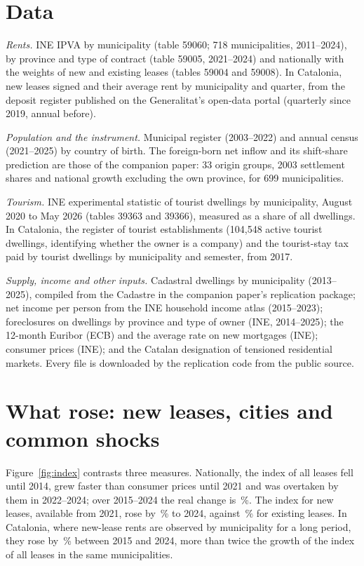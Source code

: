 \documentclass[11pt,a4paper]{article}
\begin{document}




\section{Data}\label{sec:data}

\textit{Rents.} INE IPVA by municipality (table 59060; 718 municipalities, 2011--2024), by province and type of contract (table 59005, 2021--2024) and nationally with the weights of new and existing leases (tables 59004 and 59008). In Catalonia, new leases signed and their average rent by municipality and quarter, from the deposit register published on the Generalitat's open-data portal (quarterly since 2019, annual before).

\textit{Population and the instrument.} Municipal register (2003--2022) and annual census (2021--2025) by country of birth. The foreign-born net inflow and its shift-share prediction are those of the companion paper: 33 origin groups, 2003 settlement shares and national growth excluding the own province, for 699 municipalities.

\textit{Tourism.} INE experimental statistic of tourist dwellings by municipality, August 2020 to May 2026 (tables 39363 and 39366), measured as a share of all dwellings. In Catalonia, the register of tourist establishments (104,548 active tourist dwellings, identifying whether the owner is a company) and the tourist-stay tax paid by tourist dwellings by municipality and semester, from 2017.

\textit{Supply, income and other inputs.} Cadastral dwellings by municipality (2013--2025), compiled from the Cadastre in the companion paper's replication package; net income per person from the INE household income atlas (2015--2023); foreclosures on dwellings by province and type of owner (INE, 2014--2025); the 12-month Euribor (ECB) and the average rate on new mortgages (INE); consumer prices (INE); and the Catalan designation of tensioned residential markets. Every file is downloaded by the replication code from the public source.

\section{What rose: new leases, cities and common shocks}\label{sec:facts}

Figure~\ref{fig:index} contrasts three measures. Nationally, the index of all leases fell until 2014, grew faster than consumer prices until 2021 and was overtaken by them in 2022--2024; over 2015--2024 the real change is \realIpva\,\%. The index for new leases, available from 2021, rose by \newGrowth\,\% to 2024, against \existGrowth\,\% for existing leases. In Catalonia, where new-lease rents are observed by municipality for a long period, they rose by \catNew\,\% between 2015 and 2024, more than twice the growth of the index of all leases in the same municipalities.
\end{document}
